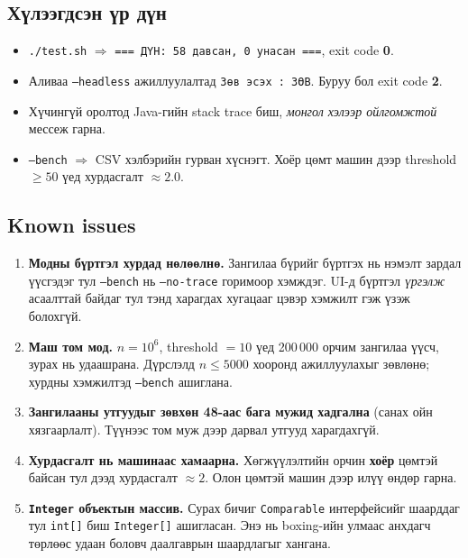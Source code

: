 \documentclass[11pt,a4paper]{article}
\begin{document}
\subsection{Хүлээгдсэн үр дүн}
\begin{itemize}[nosep,leftmargin=*]
  \item \texttt{./test.sh} $\Rightarrow$ \texttt{=== ДҮН: 58 давсан, 0 унасан ===},
        exit code \textbf{0}.
  \item Аливаа \texttt{--headless} ажиллуулалтад \texttt{Зөв эсэх : ЗӨВ}.
        Буруу бол exit code \textbf{2}.
  \item Хүчингүй оролтод Java-гийн stack trace биш, \emph{монгол хэлээр
        ойлгомжтой} мессеж гарна.
  \item \texttt{--bench} $\Rightarrow$ CSV хэлбэрийн гурван хүснэгт.
        Хоёр цөмт машин дээр threshold $\ge 50$ үед хурдасгалт $\approx 2.0$.
\end{itemize}

\subsection{Known issues}
\begin{enumerate}[nosep,leftmargin=*]
  \item \textbf{Модны бүртгэл хурдад нөлөөлнө.} Зангилаа бүрийг бүртгэх нь
        нэмэлт зардал үүсгэдэг тул \texttt{--bench} нь
        \texttt{--no-trace} горимоор хэмждэг. UI-д бүртгэл \emph{үргэлж} асаалттай
        байдаг тул тэнд харагдах хугацааг цэвэр хэмжилт гэж үзэж болохгүй.
  \item \textbf{Маш том мод.} $n = 10^6$, threshold $= 10$ үед 200\,000 орчим
        зангилаа үүсч, зурах нь удаашрана. Дүрслэлд $n \le 5000$ хооронд
        ажиллуулахыг зөвлөнө; хурдны хэмжилтэд \texttt{--bench} ашиглана.
  \item \textbf{Зангилааны утгуудыг зөвхөн 48-аас бага мужид хадгална}
        (санах ойн хязгаарлалт). Түүнээс том муж дээр дарвал утгууд харагдахгүй.
  \item \textbf{Хурдасгалт нь машинаас хамаарна.} Хөгжүүлэлтийн орчин
        \textbf{хоёр} цөмтэй байсан тул дээд хурдасгалт $\approx 2$. Олон цөмтэй
        машин дээр илүү өндөр гарна.
  \item \textbf{\texttt{Integer} объектын массив.} Сурах бичиг
        \texttt{Comparable} интерфейсийг шаарддаг тул \texttt{int[]} биш
        \texttt{Integer[]} ашигласан. Энэ нь boxing-ийн улмаас анхдагч төрлөөс
        удаан боловч даалгаврын шаардлагыг хангана.
\end{enumerate}
\end{document}
